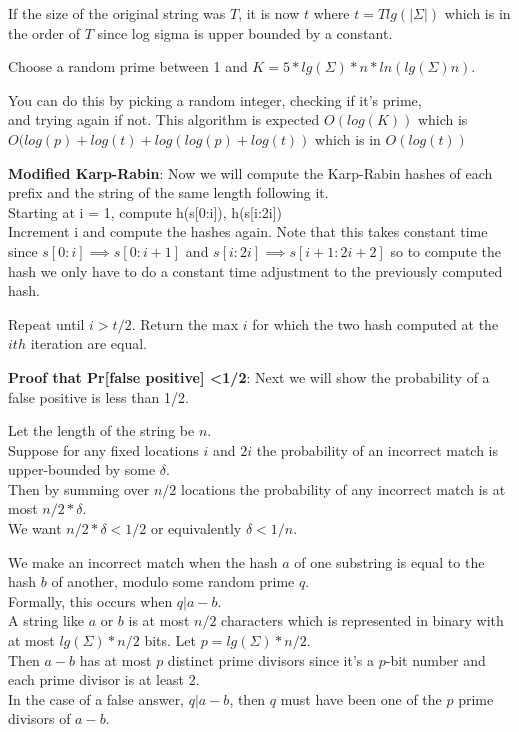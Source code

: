 \documentclass[11pt]{article}
\begin{document}
If the size of the original string was $T$, it is now $t$ where $t = T lg(|\Sigma|)$ which is in the order of $T$ since log sigma is upper bounded by a constant.

Choose a random prime between 1 and $K = 5*lg(\Sigma)*n*ln(lg(\Sigma)n)$.

You can do this by picking a random integer, checking if it's prime,\\
and trying again if not. This algorithm is expected $O(log(K))$ which is $O(log(p) + log(t) + log(log(p) + log(t))$ which is in $O(log(t))$

\textbf{Modified Karp-Rabin}:
Now we will compute the Karp-Rabin hashes of each prefix and the string of the same length following it.\\
Starting at i = 1, compute h(s[0:i]), h(s[i:2i])\\
Increment i and compute the hashes again. Note that this takes constant time since $s[0:i] \implies s[0:i+1]$ and $s[i:2i] \implies s[i+1:2i+2]$ so to compute the hash we only have to do a constant time adjustment to the previously computed hash.

Repeat until $i > t/2$. Return the max $i$ for which the two hash computed at the $ith$ iteration are equal.

\textbf{Proof that Pr[false positive] \textless 1/2}:
Next we will show the probability of a false positive is less than 1/2.

Let the length of the string be $n$. \\
Suppose for any fixed locations $i$ and $2i$ the probability of an incorrect match is upper-bounded by some $\delta$.\\
Then by summing over $n/2$ locations the probability of any incorrect match is at most $n/2 * \delta$.\\
We want $n/2 * \delta < 1/2$ or equivalently $\delta < 1/n$.

We make an incorrect match when the hash $a$ of one substring is equal to the hash $b$ of another, modulo some random prime $q$.\\
Formally, this occurs when $q | a-b$.\\
A string like $a$ or $b$ is at most $n/2$ characters which is represented in binary with at most $lg(\Sigma)* n/2$ bits. Let $p=lg(\Sigma) * n/2$.\\

Then $a-b$ has at most $p$ distinct prime divisors since it's a $p$-bit number and each prime divisor is at least 2.\\
In the case of a false answer, $q | a-b$, then $q$ must have been one of the $p$ prime divisors of $a-b$.
\end{document}
